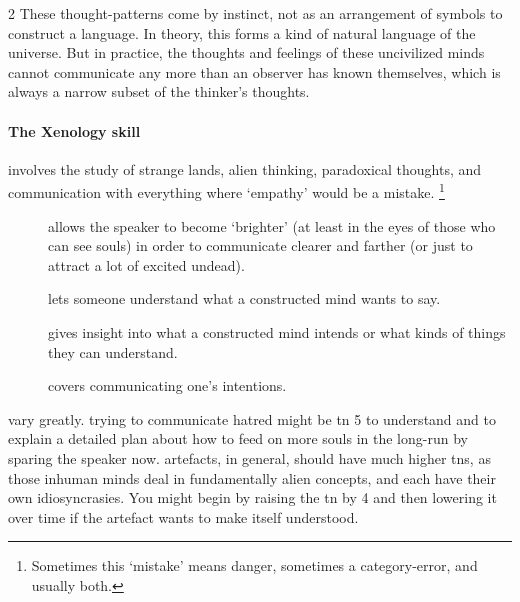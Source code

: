\begin{multicols}{2}
These thought-patterns come by instinct, not as an arrangement of symbols to construct a language.
In theory, this forms a kind of natural language of the universe.
But in practice, the thoughts and feelings of these uncivilized minds cannot communicate any more than an observer has known themselves, which is always a narrow subset of the thinker's thoughts.


\paragraph{The Xenology \gls{skill}}
involves the study of strange lands, alien thinking, paradoxical thoughts, and communication with everything where `empathy' would be a mistake.%
\footnote{Sometimes this `mistake' means danger, sometimes a category-error, and usually both.}

\begin{description}
  \item[]
    allows the speaker to become `brighter' (at least in the eyes of those who can see souls)
    in order to communicate clearer and farther (or just to attract a lot of excited \gls{undead}).
  \item[]
    lets someone understand what a constructed mind wants to say.
  \item[]
    gives insight into what a constructed mind intends or what kinds of things they can understand.
  \item[]
    covers communicating one's intentions.
\end{description}

 vary greatly.
 trying to communicate hatred might be \gls{tn} 5 to understand and \tn[10] to explain a detailed plan about how to feed on more souls in the long-run by sparing the speaker now.
\Glspl{artefact}, in general, should have much higher \glspl{tn}, as those inhuman minds deal in fundamentally alien concepts, and each have their own idiosyncrasies.
You might begin by raising the \gls{tn} by 4 and then lowering it over time if the \gls{artefact} wants to make itself understood.

\end{multicols}

